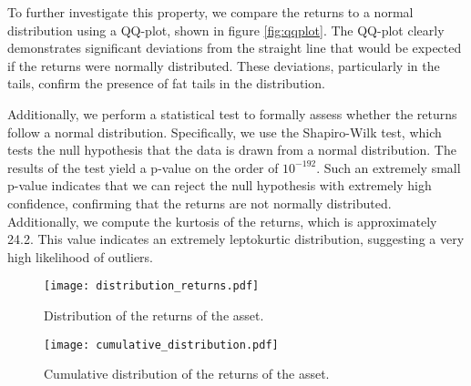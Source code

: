 To further investigate this property, we compare the returns to a normal distribution using a QQ-plot, shown in figure \ref{fig:qqplot}. The QQ-plot clearly demonstrates significant deviations from the straight line that would be expected if the returns were normally distributed. These deviations, particularly in the tails, confirm the presence of fat tails in the distribution.

Additionally, we perform a statistical test to formally assess whether the returns follow a normal distribution. Specifically, we use the Shapiro-Wilk test, which tests the null hypothesis that the data is drawn from a normal distribution. The results of the test yield a p-value on the order of $10^{-192}$. Such an extremely small p-value indicates that we can reject the null hypothesis with extremely high confidence, confirming that the returns are not normally distributed. Additionally, we compute the kurtosis of the returns, which is approximately 24.2. This value indicates an extremely leptokurtic distribution, suggesting a very high likelihood of outliers.
\begin{figure}[H]
    \centering
    \begin{minipage}[T]{0.45\textwidth}
        \centering
        \texttt{[image: distribution\_returns.pdf]}
        \caption{Distribution of the returns of the asset.}
        \label{fig:returns_distribution}
    \end{minipage}
    \hfill
    \begin{minipage}[T]{0.45\textwidth}
        \centering
        \texttt{[image: cumulative\_distribution.pdf]}
        \caption{Cumulative distribution of the returns of the asset.}
        \label{fig:cumulative_returns_distribution}
    \end{minipage}
\end{figure}


